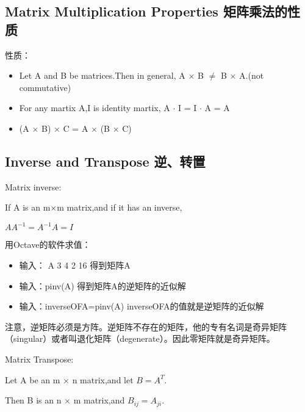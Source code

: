 \documentclass[UTF8]{ctexart}
\begin{document}
\subsection{Matrix Multiplication Properties 矩阵乘法的性质}
性质：
\begin{itemize}
  \item Let A and B be matrices.Then in general, A $\times$ B $\neq$ B $\times$ A.(not commutative)
  \item For any martix A,I is identity martix, A $\cdot$ I = I $\cdot$ A = A
  \item (A $\times$ B) $\times$ C = A $\times$ (B $\times$ C)
\end{itemize}

\subsection{Inverse and Transpose 逆、转置}
Matrix inverse:

\qquad If A is an m$\times$m matrix,and if it has an inverse,

 \qquad \qquad \qquad $AA^{-1}=A^{-1}A=I$

用Octave的软件求值：
\begin{itemize}
 \item 输入： A 3 4 2 16  得到矩阵A
 \item 输入：pinv(A) 得到矩阵A的逆矩阵的近似解
 \item 输入：inverseOFA=pinv(A) inverseOFA的值就是逆矩阵的近似解
\end{itemize}

注意，逆矩阵必须是方阵。逆矩阵不存在的矩阵，他的专有名词是奇异矩阵（singular）或者叫退化矩阵（degenerate）。因此零矩阵就是奇异矩阵。

Matrix Transpose:

\qquad Let A be an m $\times$ n matrix,and let $B=A^{T}$.

\qquad Then B is an n $\times$ m matrix,and $B_{ij}=A_{ji}$.
\end{document}

